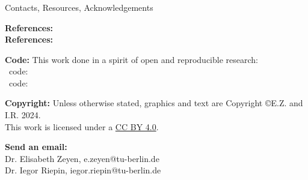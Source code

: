 \begin{frame}\frametitle{\quad}

  {\Large
  \alert{Contacts, Resources, Acknowledgements}
  }

  \vspace{0.1cm}
    
  {\bf References:}
  \\
  {\bf References:} 

  {\bf Code:} This work done in a spirit of open and reproducible research: \\
  \faUnlock~code:
   \\
  \faUnlock~code: 
  
  \vspace{.1cm}
  {\bf Copyright:} Unless otherwise stated, graphics and text are Copyright \copyright E.Z. and I.R. 2024. \\
  This work is licensed under a \href{https://creativecommons.org/licenses/by/4.0/}{CC BY 4.0}.  {\footnotesize \ccby} 

  \vspace{.1cm}
  {\bf Send an email:} \\
  Dr. Elisabeth Zeyen, e.zeyen@tu-berlin.de\\
  Dr. Iegor Riepin, iegor.riepin@tu-berlin.de \\
  
\end{frame}



